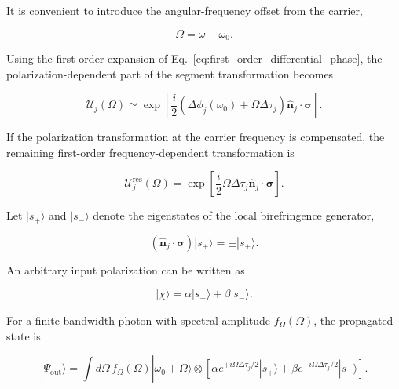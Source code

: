 It is convenient to introduce the angular-frequency offset from the carrier,

\begin{equation}
\Omega
=
\omega-\omega_0.
\label{eq:angular_frequency_offset}
\end{equation}

Using the first-order expansion of
Eq.~\eqref{eq:first_order_differential_phase}, the polarization-dependent part
of the segment transformation becomes

\begin{equation}
\mathcal{U}_j(\Omega)
\simeq
\exp
\left[
\frac{i}{2}
\left(
\Delta\phi_j(\omega_0)
+
\Omega\Delta\tau_j
\right)
\hat{\mathbf n}_j
\cdot
\boldsymbol{\sigma}
\right].
\label{eq:segment_first_order_frequency_operator}
\end{equation}

If the polarization transformation at the carrier frequency is compensated, the
remaining first-order frequency-dependent transformation is

\begin{equation}
\boxed{
\mathcal{U}_j^{\mathrm{res}}(\Omega)
=
\exp
\left[
\frac{i}{2}
\Omega\Delta\tau_j
\hat{\mathbf n}_j
\cdot
\boldsymbol{\sigma}
\right].
}
\label{eq:residual_single_segment_operator}
\end{equation}

Let \( |s_+\rangle \) and \( |s_-\rangle \) denote the eigenstates of the local
birefringence generator,

\begin{equation}
\left(
\hat{\mathbf n}_j
\cdot
\boldsymbol{\sigma}
\right)
|s_\pm\rangle
=
\pm |s_\pm\rangle.
\label{eq:segment_birefringence_generator_eigenstates}
\end{equation}

An arbitrary input polarization can be written as

\begin{equation}
|\chi\rangle
=
\alpha|s_+\rangle
+
\beta|s_-\rangle.
\label{eq:input_segment_eigenmode_superposition}
\end{equation}

For a finite-bandwidth photon with spectral amplitude \(f_\Omega(\Omega)\), the
propagated state is

\begin{equation}
|\Psi_{\mathrm{out}}\rangle
=
\int d\Omega\,
f_\Omega(\Omega)
|\omega_0+\Omega\rangle
\otimes
\left[
\alpha
e^{+i\Omega\Delta\tau_j/2}
|s_+\rangle
+
\beta
e^{-i\Omega\Delta\tau_j/2}
|s_-\rangle
\right].
\label{eq:single_segment_frequency_polarization_state}
\end{equation}

